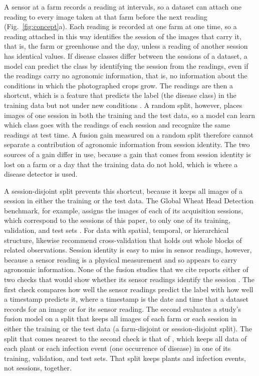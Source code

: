 \documentclass[preprint,12pt,authoryear,nopreprintline]{elsarticle}
\begin{document}
A sensor at a farm records a reading at intervals, so a dataset can attach one
reading to every image taken at that farm before the next reading
(Fig.~\ref{fig:concept}a). Each reading is recorded at one farm at one time, so a
reading attached in this way identifies the session of the images that carry it, that
is, the farm or greenhouse and the day, unless a reading of another session has identical
values. If disease classes differ between the
sessions of a dataset, a model can predict the class by identifying the session from
the readings, even if the readings carry no agronomic information, that is, no
information about the conditions in which the photographed crops grow. The readings are then a
shortcut, which is a feature that predicts the label (the disease class) in the training
data but not under new conditions \citep{geirhos2020shortcut,koh2021wilds}. A random split, however, places
images of one session in both the training and the test data, so a model can learn
which class goes with the readings of each session and recognize the same readings at
test time. A fusion gain measured on a random split therefore cannot separate a
contribution of agronomic information from session identity. The two sources of a gain
differ in use, because a gain that comes from session identity is lost on a farm or a
day that the training data do not hold, which is where a disease detector is used.

A session-disjoint split prevents this shortcut, because it keeps all images of a
session in either the training or the test data. The Global Wheat Head Detection benchmark, for example, assigns the images of
each of its acquisition sessions, which correspond to the sessions of this paper, to
only one of its training, validation, and test sets \citep{gwhd2021}. For
data with spatial, temporal, or hierarchical structure,
\citet{roberts2017crossvalidation} likewise recommend cross-validation that holds out whole
blocks of related observations. Session identity is easy to miss in sensor readings,
however, because a sensor reading is a physical measurement and so appears to carry
agronomic information. None of the fusion studies that we cite reports either of two
checks that would show whether its sensor readings identify the session
\citep{berrocal2026,agrifusion2026,jamun2025iot,cornsentry2026,appliedsci2024dacon,agrovision2025,partitioned2026,xu2025wheat}.
The first check compares how well the sensor readings predict the label with how
well a timestamp predicts it, where a timestamp is the date and time that a dataset
records for an image or for its sensor reading. The second evaluates a study's fusion
model on a split that keeps all images of each farm or each session in either the
training or the test data (a farm-disjoint or session-disjoint split). The split
that comes nearest to the second check is that of \citet{partitioned2026}, which keeps
all data of each plant or each infection event (one occurrence of disease) in one of
its training, validation, and test sets. That split keeps plants and infection events,
not sessions, together.
\end{document}
